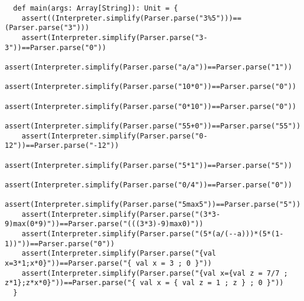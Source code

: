\documentclass[a4paper, 10pt]{article}
\theoremstyle{remark}
\begin{document}
\begin{lstlisting}
  def main(args: Array[String]): Unit = {
    assert((Interpreter.simplify(Parser.parse("3%5")))==(Parser.parse("3")))
    assert(Interpreter.simplify(Parser.parse("3-3"))==Parser.parse("0"))
    assert(Interpreter.simplify(Parser.parse("a/a"))==Parser.parse("1"))
    assert(Interpreter.simplify(Parser.parse("10*0"))==Parser.parse("0"))
    assert(Interpreter.simplify(Parser.parse("0*10"))==Parser.parse("0"))
    assert(Interpreter.simplify(Parser.parse("55+0"))==Parser.parse("55"))
    assert(Interpreter.simplify(Parser.parse("0-12"))==Parser.parse("-12"))
    assert(Interpreter.simplify(Parser.parse("5*1"))==Parser.parse("5"))
    assert(Interpreter.simplify(Parser.parse("0/4"))==Parser.parse("0"))
    assert(Interpreter.simplify(Parser.parse("5max5"))==Parser.parse("5"))
    assert(Interpreter.simplify(Parser.parse("(3*3-9)max(0*9)"))==Parser.parse("(((3*3)-9)max0)"))
    assert(Interpreter.simplify(Parser.parse("(5*(a/(--a)))*(5*(1-1))"))==Parser.parse("0"))
    assert(Interpreter.simplify(Parser.parse("{val x=3*1;x*0}"))==Parser.parse("{ val x = 3 ; 0 }"))
    assert(Interpreter.simplify(Parser.parse("{val x={val z = 7/7 ; z*1};z*x*0}"))==Parser.parse("{ val x = { val z = 1 ; z } ; 0 }"))
  }
\end{lstlisting}
\end{document}
